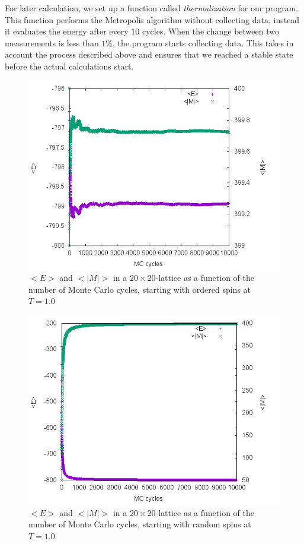 \documentclass[10pt,a4paper]{article}
\begin{document}
\label{results}
For later calculation, we set up a function called \emph{thermalization} for our program. This function performs the Metropolis algorithm without collecting data, instead it evaluates the energy after every 10 cycles. When the change between two measurements is less than $1\%$, the program starts collecting data. This takes in account the process described above and ensures that we reached a stable state before the actual calculations start.
\begin{figure}[h]
	\includegraphics[width=\textwidth]{a1o.png}
	\caption{$<E>$ and $<|M|>$ in a $20\times 20$-lattice as a function of the number of Monte Carlo cycles, starting with ordered spins at $T=1.0$ \label{c_1}}
\end{figure}
\begin{figure}[h]
	\includegraphics[width=\textwidth]{a1r.png}
	\caption{$<E>$ and $<|M|>$ in a $20\times 20$-lattice as a function of the number of Monte Carlo cycles, starting with random spins at $T=1.0$\label{c_2}}
\end{figure}
\end{document}
